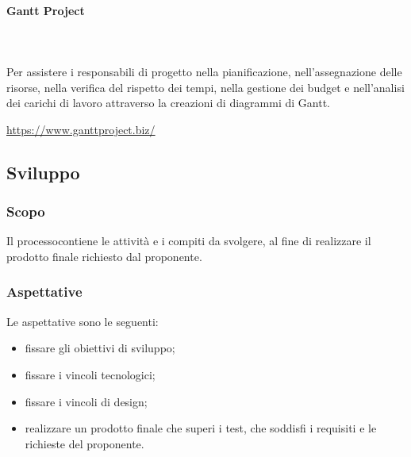		\paragraph{Gantt Project} \mbox{}\\ \mbox{}\\
		Per assistere i responsabili di progetto nella pianificazione, nell'assegnazione delle risorse, nella verifica del rispetto dei tempi, nella gestione dei budget e nell'analisi dei carichi di lavoro attraverso la creazioni di diagrammi di Gantt\glo. \\
		\centerline{\url{https://www.ganttproject.biz/}}
		\pagebreak
		\begin{comment}
		\textbf{(questa ultima sezione è da inserire nella fase successiva)}
		\subsubsection{Collaudo e consegna del prodotto}
		Al fine di consegnare il prodotto terminato il gruppo deve effettuare un collaudo in presenza del proponente e dei committenti. Precedentemente a questo test il gruppo deve assicurare correttezza, completezza e affidabilità per ogni parte del materiale consegnato, permettendo così che tutti i requisiti obbligatori siano soddisfatti e l'esecuzione dei test abbiano un esito positivo. In seguito al collaudo finale il responsabile di progetto consegna il prodotto su un supporto fisico.
		\end{comment}
     
\subsection{Sviluppo}
	\subsubsection{Scopo}
	Il processo\glosp contiene le attività e i compiti da svolgere, al fine di realizzare il prodotto finale richiesto dal proponente.
	\subsubsection{Aspettative}
	Le aspettative sono le seguenti:
	\begin{itemize}
		\item fissare gli obiettivi di sviluppo;
		\item fissare i vincoli tecnologici;
		\item fissare i vincoli di design;
		\item realizzare un prodotto finale che superi i test, che soddisfi i requisiti e le richieste del proponente.
	\end{itemize}
